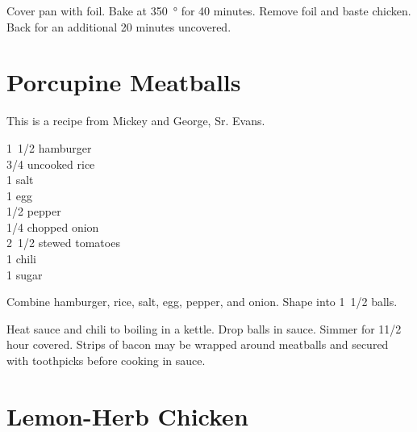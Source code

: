 Cover pan with foil.  Bake at \SI{350}{\degree} for 40 minutes.  Remove foil and
baste chicken.  Back for an additional 20 minutes uncovered.

\section{Porcupine Meatballs}

\begin{open}
  This is a recipe from Mickey and George, Sr. Evans.
\end{open}
\begin{ingredients}
  \SI{1/2}[1]{\pound} hamburger \\
  \SI{3/4}{\cup} uncooked rice \\
  \SI{1}{\teaspoon} salt \\
  1 egg \\
  \SI{1/2}{\teaspoon} pepper \\
  \SI{1/4}{\cup} chopped onion \\
  \SI{1/2}[2]{\cup} stewed tomatoes \\
  \SI{1}{\teaspoon} chili \\
  \SI{1}{\teaspoon} sugar
\end{ingredients}
Combine hamburger, rice, salt, egg, pepper, and onion.  Shape into
\SI{1/2}[1]{\inch} balls.

Heat sauce and chili to boiling in a kettle.  Drop balls in sauce.  Simmer for
1\num{1/2} hour covered.  Strips of bacon may be wrapped around meatballs
and secured with toothpicks before cooking in sauce.

\section{Lemon-Herb Chicken}

